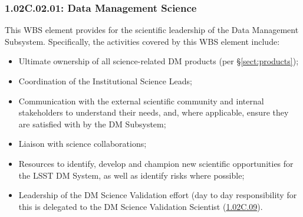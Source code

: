 \subsubsection*{1.02C.02.01: Data Management Science}

This WBS element provides for the scientific leadership of the Data Management
Subsystem. Specifically, the activities covered by this WBS element include:

\begin{itemize}

  \item{Ultimate ownership of all science-related DM products (per \S\ref{sect:products});}

  \item{Coordination of the Institutional Science Leads;}

  \item{Communication with the external scientific community and internal
  stakeholders to understand their needs, and, where applicable, ensure they
  are satisfied with by the DM Subsystem;}

  \item{Liaison with science collaborations;}

  \item{Resources to identify, develop and champion new scientific
  opportunities for the LSST DM System, as well as identify risks where
  possible;}

  \item{Leadership of the DM Science Validation effort (day to day
  responsibility for this is delegated to the DM Science Validation Scientist
  (\hyperref[wbs:1.02C.09]{1.02C.09}).}

\end{itemize}
